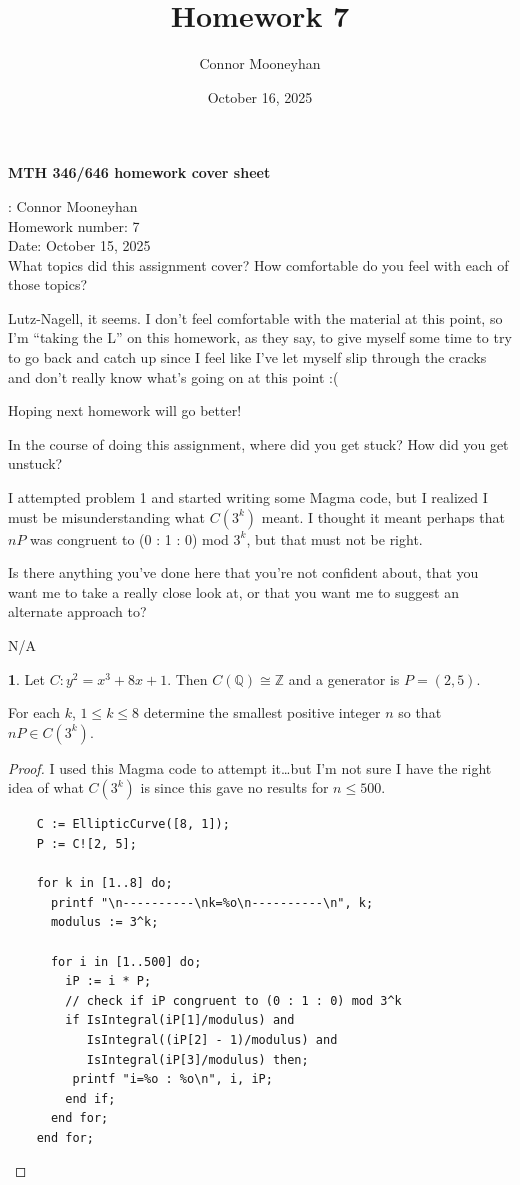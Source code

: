 \documentclass[12pt]{article}
\title{Homework 7}
\author{Connor Mooneyhan}
\date{October 16, 2025}
\theoremstyle{definition}
\newtheorem{ex}{}
\begin{document}
\begin{center}
	{\bf\Large MTH 346/646 homework cover sheet}
\end{center}

\vspace{0.5in}

: Connor Mooneyhan \\
{\large Homework number}: 7 \\
{\large Date}: October 15, 2025 \\

{\Large What topics did this assignment cover? How comfortable do you feel with
each of those topics?}

Lutz-Nagell, it seems. I don't feel comfortable with the material at this point, so I'm ``taking the L'' on this homework, as they say, to give myself some time to try to go back and catch up since I feel like I've let myself slip through the cracks and don't really know what's going on at this point :(

Hoping next homework will go better!


\vspace{1.75in}

{\Large In the course of doing this assignment, where did you get stuck?
	How did you get unstuck?}

I attempted problem 1 and started writing some Magma code, but I realized I must be misunderstanding what $C(3^k)$ meant. I thought it meant perhaps that $nP$ was congruent to (0 : 1 : 0) mod $3^k$, but that must not be right.

\vspace{1.75in}

{\Large Is there anything you've done here that you're not confident about, that you want me to take a really close look at, or that you want me to suggest an alternate approach to?}

N/A

\pagebreak

\begin{ex}
	Let $C : y^{2} = x^{3} + 8x + 1$. Then $C(\mathbb{Q}) \cong \mathbb{Z}$ and
	a generator is $P = (2,5)$.

	For each $k$, $1 \leq k \leq 8$ determine the smallest positive integer $n$
	so that $nP \in C(3^{k})$.
\end{ex}
\begin{proof}
  I used this Magma code to attempt it\dots but I'm not sure I have the right idea of what $C(3^k)$ is since this gave no results for $n \leq 500$.
	\begin{verbatim}
    C := EllipticCurve([8, 1]);
    P := C![2, 5];

    for k in [1..8] do;
      printf "\n----------\nk=%o\n----------\n", k;
      modulus := 3^k;

      for i in [1..500] do;
        iP := i * P;
        // check if iP congruent to (0 : 1 : 0) mod 3^k
        if IsIntegral(iP[1]/modulus) and
           IsIntegral((iP[2] - 1)/modulus) and
           IsIntegral(iP[3]/modulus) then;
         printf "i=%o : %o\n", i, iP;
        end if;
      end for;
    end for;
  \end{verbatim}
\end{proof}
\end{document}
